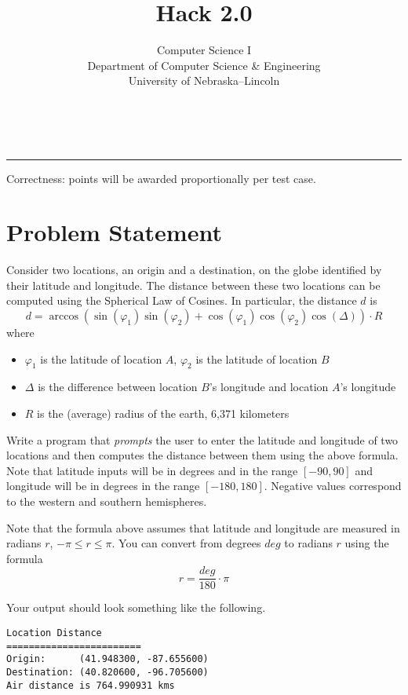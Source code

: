 \documentclass[12pt]{scrartcl}
\title{Hack 2.0}\let\Title\@title
\subtitle{Computer Science I\\
{\small
\vskip1cm
Department of Computer Science \& Engineering \\
University of Nebraska--Lincoln}
\vskip-1cm}
\date{~}
\begin{document}
\maketitle

\hrule



Correctness: points will be awarded proportionally per test case.

\section*{Problem Statement}

Consider two locations, an origin and a destination, on the globe 
identified by their latitude and longitude.  The distance between
these two locations can be computed using the Spherical Law of 
Cosines.  In particular, the distance $d$ is
 $$d = \arccos{(\sin(\varphi_1) \sin(\varphi_2) + \cos(\varphi_1) \cos(\varphi_2) \cos(\Delta) )} \cdot R$$
where
\begin{itemize}
  \item $\varphi_1$ is the latitude of location $A$, $\varphi_2$ is the latitude of location $B$
  \item $\Delta$ is the difference between location $B$'s longitude and location $A$'s longitude
  \item $R$ is the (average) radius of the earth, 6,371 kilometers
\end{itemize}

Write a program that \emph{prompts} the user to enter the latitude 
and longitude of two locations and then computes the distance between them using
the above formula.  Note that latitude inputs will be in degrees and in the
range $[-90, 90]$ and longitude will be in degrees in the range $[-180, 180]$.
Negative values correspond to the western and southern hemispheres.  

Note that the formula above assumes that latitude and longitude are 
measured in radians $r$, $-\pi \leq r \leq \pi$.  You can convert from
degrees $deg$ to radians $r$ using the formula
  $$r = \frac{deg}{180} \cdot \pi$$  

Your output should look something like the following.  

\begin{verbatim}
Location Distance
========================
Origin:      (41.948300, -87.655600)
Destination: (40.820600, -96.705600)
Air distance is 764.990931 kms
\end{verbatim}
\end{document}
